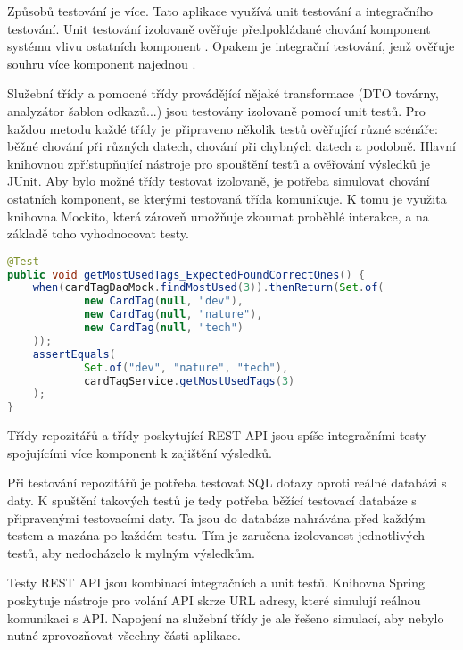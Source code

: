 		Způsobů testování je více.
		Tato aplikace využívá unit testování a integračního testování.
		Unit testování izolovaně ověřuje předpokládané chování komponent systému vlivu
		ostatních komponent \cite{unit_testing}.
		Opakem je integrační testování, jenž ověřuje souhru více komponent najednou \cite{integration_testing}.

		Služební třídy a pomocné třídy provádějící nějaké transformace (\ac{DTO} továrny, analyzátor šablon odkazů...)
		jsou testovány izolovaně pomocí unit testů.
		Pro každou metodu každé třídy je připraveno několik testů ověřující různé scénáře: běžné chování při různých datech,
		chování při chybných datech a podobně.
		Hlavní knihovnou zpřístupňující nástroje pro spouštění testů a ověřování výsledků je JUnit.
		Aby bylo možné třídy testovat izolovaně, je potřeba simulovat chování ostatních komponent, se kterými testovaná
		třída komunikuje.
		K tomu je využita knihovna Mockito, která zároveň umožňuje zkoumat proběhlé interakce, a na základě toho vyhodnocovat testy.

		\begin{lstlisting}[language=Java, caption={Testu ověřující, že služba štítků vrací správné nejvyužívanější štítky z nasimulovaného repozitáře. Zdroj: [autor]}]
@Test
public void getMostUsedTags_ExpectedFoundCorrectOnes() {
	when(cardTagDaoMock.findMostUsed(3)).thenReturn(Set.of(
			new CardTag(null, "dev"),
			new CardTag(null, "nature"),
			new CardTag(null, "tech")
	));
	assertEquals(
			Set.of("dev", "nature", "tech"),
			cardTagService.getMostUsedTags(3)
	);
}
		\end{lstlisting}

		Třídy repozitářů a třídy poskytující \ac{REST} \ac{API} jsou spíše integračními testy spojujícími více
		komponent k zajištění výsledků.

		Při testování repozitářů je potřeba testovat \ac{SQL} dotazy oproti reálné databázi s daty.
		K spuštění takových testů je tedy potřeba běžící testovací databáze s připravenými testovacími daty.
		Ta jsou do databáze nahrávána před každým testem a mazána po každém testu.
		Tím je zaručena izolovanost jednotlivých testů, aby nedocházelo k mylným výsledkům.

		Testy \ac{REST} \ac{API} jsou kombinací integračních a unit testů.
		Knihovna Spring poskytuje nástroje pro volání \ac{API} skrze \ac{URL} adresy, které simulují reálnou komunikaci
		s \ac{API}.
		Napojení na služební třídy je ale řešeno simulací, aby nebylo nutné zprovozňovat všechny části
		aplikace.


